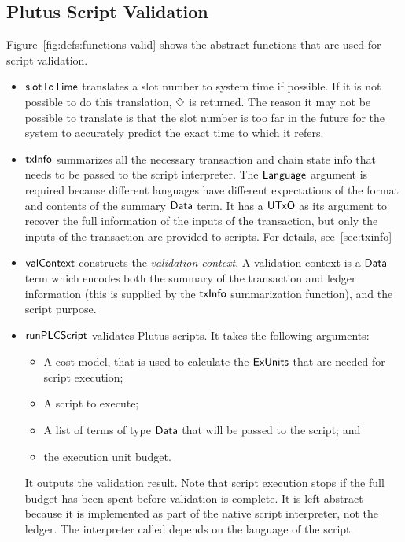 \subsection{Plutus Script Validation}
Figure~\ref{fig:defs:functions-valid} shows the abstract functions that are used for script validation.

\begin{itemize}
\item $\mathsf{slotToTime}$ translates a slot number to system time if possible.
If it is not possible to do this translation, $\Diamond$ is returned.
The reason it may not be possible to translate is that the slot number
is too far in the future for the system to accurately
predict the exact time to which it refers.

\item $\mathsf{txInfo}$ summarizes all the necessary transaction and chain state info
  that needs to be passed to the script interpreter. The $\mathsf{Language}$ argument
  is required because different languages have different expectations of the
  format and contents of the summary $\mathsf{Data}$ term.
  It has a $\mathsf{UTxO}$ as its argument to recover the full information of the inputs of the transaction,
  but only the inputs of the transaction are provided to scripts. For details, see~\ref{sec:txinfo}

\item
  $\mathsf{valContext}$ constructs the \emph{validation context}. A validation context is
  a $\mathsf{Data}$ term which encodes both the summary of the transaction and ledger information
  (this is supplied by the $\mathsf{txInfo}$ summarization function), and the script purpose.

\item
  $\mathsf{runPLCScript}$ validates Plutus scripts. It takes the following
  arguments:
  \begin{itemize}
  \item A cost model, that is used to calculate the $\mathsf{ExUnits}$ that are needed for script execution;
  \item A script to execute;
  \item A list of terms of type $\mathsf{Data}$ that will be passed to the script; and
  \item the execution unit budget.
  \end{itemize}
  It outputs the validation result.
  Note that script execution stops if the full budget has been spent before validation is complete.
  It is left abstract because it is implemented as part of the native script interpreter, not the ledger.
  The interpreter called depends on the language of the script.
\end{itemize}


